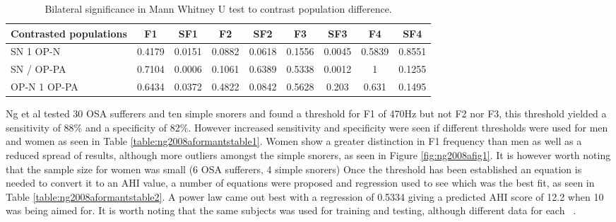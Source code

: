 \begin{table}[h]
\centering
\begin{tabular}{l c c c c c c c c}
\toprule
Contrasted populations&F1&SF1&F2&SF2&F3&SF3&F4&SF4\\ \midrule
SN 1 OP-N&0.4179&0.0151&0.0882&0.0618&0.1556&0.0045&0.5839&0.8551\\ 
SN / OP-PA&0.7104&0.0006&0.1061&0.6389&0.5338&0.0012&1&0.1255\\ 
OP-N 1 OP-PA&0.6434&0.0372&0.4822&0.0842&0.5628&0.203&0.631&0.1495\\ \bottomrule
\end{tabular}
\caption{Bilateral significance in Mann Whitney U test to contrast population difference.}
\label{table:sola2003formants}
\end{table}
Ng et al tested 30 OSA sufferers and ten simple snorers and found a threshold for F1 of 470Hz but not F2 nor F3, this threshold yielded a sensitivity of 88\% and a specificity of 82\%. However increased sensitivity and specificity were seen if different thresholds were used for men and women as seen in Table \ref{table:ng2008aformantstable1}. Women show a greater distinction in F1 frequency than men as well as a reduced spread of results, although more outliers amongst the simple snorers, as seen in Figure \ref{fig:ng2008afig1}. It is however worth noting that the sample size for women was small (6 OSA sufferers, 4 simple snorers) Once the threshold has been established an equation is needed to convert it to an AHI value, a number of equations were proposed and regression used to see which was the best fit, as seen in Table \ref{table:ng2008aformantstable2}. A power law came out best with a regression of 0.5334 giving a predicted AHI score of 12.2 when 10 was being aimed for. It is worth noting that the same subjects was used for training and testing, although different data for each ~\cite{ng2008could}.

